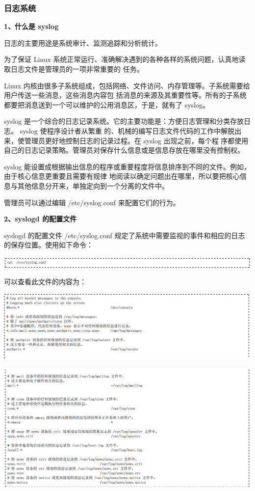 \documentclass[letterpaper,10pt]{sphinxmanual}
\begin{document}
\subsubsection{日志系统}
\label{Linux_log/syslog:id1}
\textbf{1、什么是 syslog}

日志的主要用途是系统审计、监测追踪和分析统计。

为了保证 Linux 系统正常运行、准确解决遇到的各种各样的系统问题，认真地读取日志文件是管理员的一项非常重要的
任务。

Linux 内核由很多子系统组成，包括网络、文件访问、内存管理等。子系统需要给用户传送一些消息，这些消息内容包
括消息的来源及其重要性等。所有的子系统都要把消息送到一个可以维护的公用消息区，于是，就有了 syslog。

syslog 是一个综合的日志记录系统。它的主要功能是：方便日志管理和分类存放日志。 syslog 使程序设计者从繁重
的、机械的编写日志文件代码的工作中解脱出来，使管理员更好地控制日志的记录过程。在 syslog 出现之前，每个程
序都使用自己的日志记录策略。管理员对保存什么信息或是信息存放在哪里没有控制权。

syslog 能设置成根据输出信息的程序或重要程度将信息排序到不同的文件。例如，由于核心信息更重要且需要有规律
地阅读以确定问题出在哪里，所以要把核心信息与其他信息分开来，单独定向到一个分离的文件中。

管理员可以通过编辑 /etc/syslog.conf 来配置它们的行为。

\textbf{2、syslogd 的配置文件}

syslogd 的配置文件 /etc/syslog.conf 规定了系统中需要监视的事件和相应的日志的保存位置。使用如下命令：

\includegraphics{catsyslog.png}

可以查看此文件的内容为：

\includegraphics{syslogconf1.png}

\includegraphics{syslogconf2.png}
\end{document}
